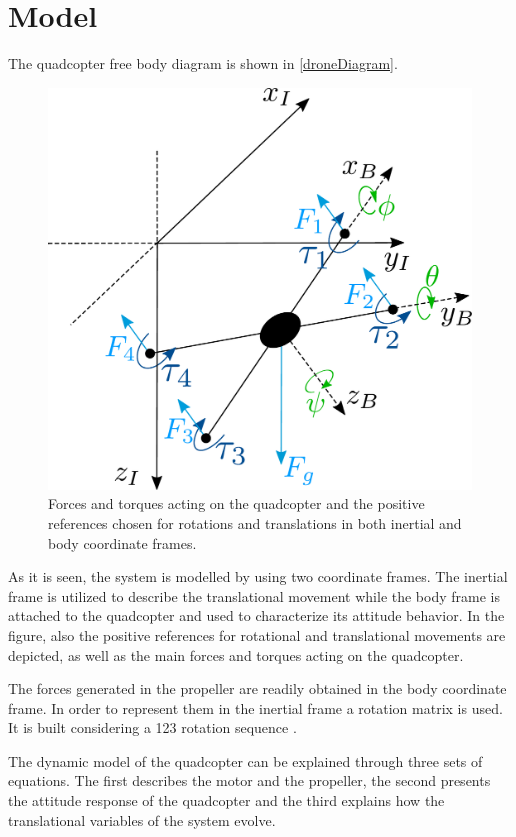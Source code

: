 \section{Model}
The quadcopter free body diagram is shown in \autoref{droneDiagram}. 
\begin{figure}[H]
	\centering
	\includegraphics[scale=0.25]{figures/droneDiagram}
	\caption{Forces and torques acting on the quadcopter and the positive references chosen for rotations and translations in both inertial and body coordinate frames.}
	\label{droneDiagram}
\end{figure}
%
As it is seen, the system is modelled by using two coordinate frames. The inertial frame is utilized to describe the translational movement while the body frame is attached to the quadcopter and used to characterize its attitude behavior. In the figure, also the positive references for rotational and translational movements are depicted, as well as the main forces and torques acting on the quadcopter. 

The forces generated in the propeller are readily obtained in the body coordinate frame. In order to represent them in the inertial frame a rotation matrix is used. It is built considering a 123 rotation sequence \cite{rotationmatrix}.
 
The dynamic model of the quadcopter can be explained through three sets of equations. The first describes the motor and the propeller, the second presents the attitude response of the quadcopter and the third explains how the translational variables of the system evolve.

